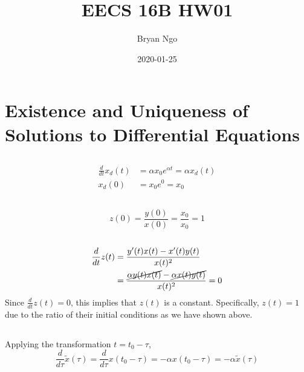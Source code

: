 \documentclass[]{article}
\title{EECS 16B HW01}
\author{Bryan Ngo}
\date{2020-01-25}
\begin{document}
\maketitle

\section{Existence and Uniqueness of Solutions to Differential Equations}

\subsection{}

\begin{align}
	\frac{d}{dt} x_d(t) &= \alpha x_0 e^{\alpha t} = \alpha x_d(t) \\
	x_d(0) &= x_0 e^0 = x_0
\end{align}

\subsection{}

\begin{equation}
	z(0) = \frac{y(0)}{x(0)} = \frac{x_0}{x_0} = 1
\end{equation}

\subsection{}

\begin{align}
	\frac{d}{dt} z(t) &= \frac{y'(t) x(t) - x'(t) y(t)}{x(t)^2} \\
	&= \frac{\cancel{\alpha y(t) x(t)} - \cancel{\alpha x(t) y(t)}}{x(t)^2} = 0
\end{align}
Since \(\frac{d}{dt} z(t) = 0\), this implies that \(z(t)\) is a constant.
Specifically, \(z(t) = 1\) due to the ratio of their initial conditions as we have shown above.

\subsection{}

Applying the transformation \(t = t_0 - \tau\),
\begin{equation}
	\frac{d}{d\tau} \tilde{x}(\tau) = \frac{d}{d\tau} x(t_0 - \tau) = -\alpha x(t_0 - \tau) = -\alpha \tilde{x}(\tau)
\end{equation}
\end{document}
